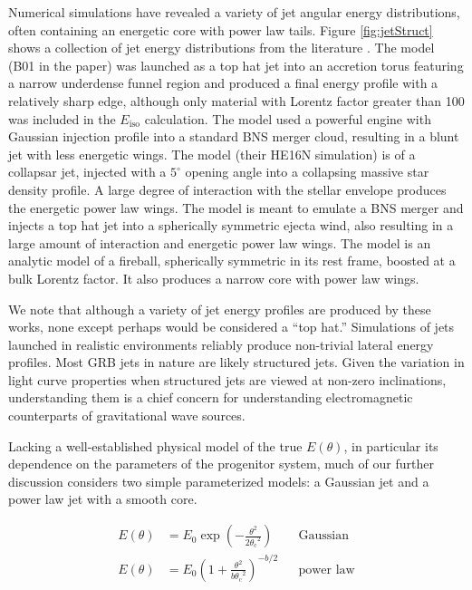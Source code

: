 \documentclass[twocolumn]{aastex62}
\newcommand{\thC}{\ensuremath{\theta_{\mathrm{c}}}}
\newcommand{\Eiso}{\ensuremath{E_{\mathrm{iso}}}}
\begin{document}
Numerical simulations have revealed a variety of jet angular energy distributions, often containing an energetic core with power law tails.  Figure \ref{fig:jetStruct} shows a collection of jet energy distributions from the literature \citep{Aloy:2005aa, Mizuta:2009aa, Duffell:2013aa, Lazzati:2017aa, Margutti:2018aa}.  The \citet{Aloy:2005aa} model (B01 in the paper) was launched as a top hat jet into an accretion torus featuring a narrow underdense funnel region and produced a final energy profile with a relatively sharp edge, although only material with Lorentz factor greater than 100 was included in the $\Eiso$ calculation.  The \citet{Margutti:2018aa} model used a powerful engine with Gaussian injection profile into a standard BNS merger cloud, resulting in a blunt jet with less energetic wings.  The \citet{Mizuta:2009aa} model (their HE16N simulation) is of a collapsar jet, injected with a $5^\circ$ opening angle into a collapsing massive star density profile.  A large degree of interaction with the stellar envelope produces the energetic power law wings.  The \citet{Lazzati:2017aa} model is meant to emulate a BNS merger and injects a top hat jet into a spherically symmetric ejecta wind, also resulting in a large amount of interaction and energetic power law wings.  The \citet{Duffell:2013aa} model is an analytic model of a fireball, spherically symmetric in its rest frame, boosted at a bulk Lorentz factor. It also produces a narrow core with power law wings.

We note that although a variety of jet energy profiles are produced by these works, none except perhaps \citet{Aloy:2005aa} would be considered a ``top hat.''  Simulations of jets launched in realistic environments reliably produce non-trivial lateral energy profiles.  Most GRB jets in nature are likely structured jets.  Given the variation in light curve properties when structured jets are viewed at non-zero inclinations, understanding them is a chief concern for understanding electromagnetic counterparts of gravitational wave sources.

Lacking a well-established physical model of the true $E(\theta)$, in particular its dependence on the parameters of the progenitor system, much of our further discussion considers two simple parameterized models: a Gaussian jet and a power law jet with a smooth core.  

\begin{align}
	E(\theta) &= E_0 \exp\left(-\frac{\theta^2}{2\thC^2}\right)  && \text{Gaussian} \label{eq:gauss}\\
	E(\theta) &= E_0 \left(1 + \frac{\theta^2}{b\thC^2} \right)^{-b/2}  && \text{power law} \label{eq:pl}
\end{align}
\end{document}
